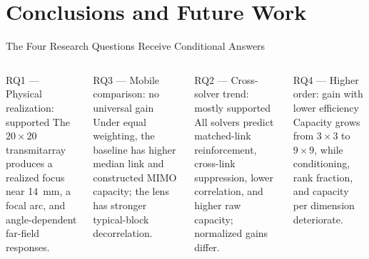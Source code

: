 
\section{Conclusions and Future Work}

\begin{frame}[t]{The Four Research Questions Receive Conditional Answers}
\scriptsize
\begin{columns}[T,onlytextwidth]
  \begin{block}{RQ1 --- Physical realization: supported}
    The $20\times20$ transmitarray produces a realized focus near 14~mm, a
    focal arc, and angle-dependent far-field responses.
  \end{block}
  \begin{block}{RQ3 --- Mobile comparison: no universal gain}
    Under equal weighting, the baseline has higher median link and constructed
    MIMO capacity; the lens has stronger typical-block decorrelation.
  \end{block}

  \begin{block}{RQ2 --- Cross-solver trend: mostly supported}
    All solvers predict matched-link reinforcement, cross-link suppression,
    lower correlation, and higher raw capacity; normalized gains differ.
  \end{block}
  \begin{block}{RQ4 --- Higher order: gain with lower efficiency}
    Capacity grows from $3\times3$ to $9\times9$, while conditioning, rank
    fraction, and capacity per dimension deteriorate.
  \end{block}
\end{columns}
\end{frame}


